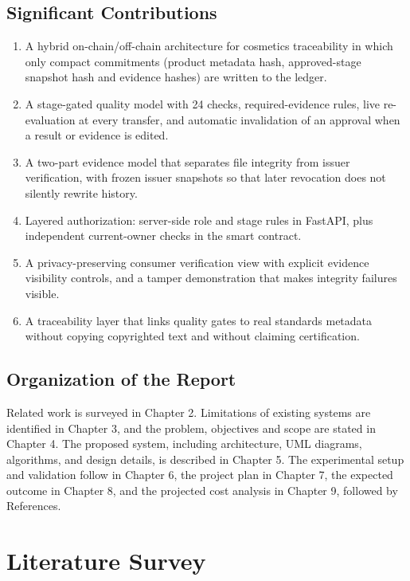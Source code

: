 \documentclass[12pt,a4paper]{report}
\begin{document}
\section{Significant Contributions}
\begin{enumerate}[leftmargin=1.8em, itemsep=3pt, parsep=0pt]
    \item A hybrid on-chain/off-chain architecture for cosmetics traceability in which only compact commitments (product metadata hash, approved-stage snapshot hash and evidence hashes) are written to the ledger.
    \item A stage-gated quality model with 24 checks, required-evidence rules, live re-evaluation at every transfer, and automatic invalidation of an approval when a result or evidence is edited.
    \item A two-part evidence model that separates file integrity from issuer verification, with frozen issuer snapshots so that later revocation does not silently rewrite history.
    \item Layered authorization: server-side role and stage rules in FastAPI, plus independent current-owner checks in the smart contract.
    \item A privacy-preserving consumer verification view with explicit evidence visibility controls, and a tamper demonstration that makes integrity failures visible.
    \item A traceability layer that links quality gates to real standards metadata without copying copyrighted text and without claiming certification.
\end{enumerate}

\section{Organization of the Report}
Related work is surveyed in Chapter 2. Limitations of existing systems are identified in Chapter 3, and the problem, objectives and scope are stated in Chapter 4. The proposed system, including architecture, UML diagrams, algorithms, and design details, is described in Chapter 5. The experimental setup and validation follow in Chapter 6, the project plan in Chapter 7, the expected outcome in Chapter 8, and the projected cost analysis in Chapter 9, followed by References.

\chapter{Literature Survey}
\end{document}
